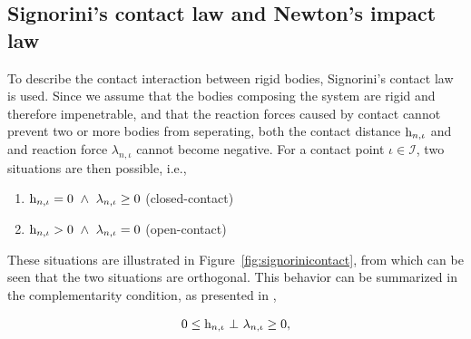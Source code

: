 \documentclass[../DC2017114Bouma.tex]{subfiles}
\begin{document}
\subsection{Signorini's contact law and Newton's impact law}\label{sec:2cont}
To describe the contact interaction between rigid bodies, Signorini's contact law is used. Since we assume that the bodies composing the system are rigid and therefore impenetrable, and that the reaction forces caused by contact cannot prevent two or more bodies from seperating, both the contact distance $\mathrm{h}_{n,\iota}$ and and reaction force $\lambda_{n,\iota}$ cannot become negative. For a contact point $\iota\in\mathcal{I}$, two situations are then possible, i.e.,
\begin{enumerate}
\item $\hrm_{n,\iota}=0\ \wedge\ \lambda_{n,\iota} \geq 0$ (closed-contact)
\item $\hrm_{n,\iota}>0\ \wedge\ \lambda_{n,\iota} = 0$ (open-contact)
\end{enumerate}
These situations are illustrated in Figure~\ref{fig:signorinicontact}, from which can be seen that the two situations are orthogonal. This behavior can be summarized in the complementarity condition, as presented in \cite[Section 5.3.1]{Leine2008},

\begin{align}
0\leq \mathrm{h}_{n,\iota}\ \bot\ \lambda_{n,\iota} \geq 0,\label{eq:signorini}
\end{align}
\end{document}

